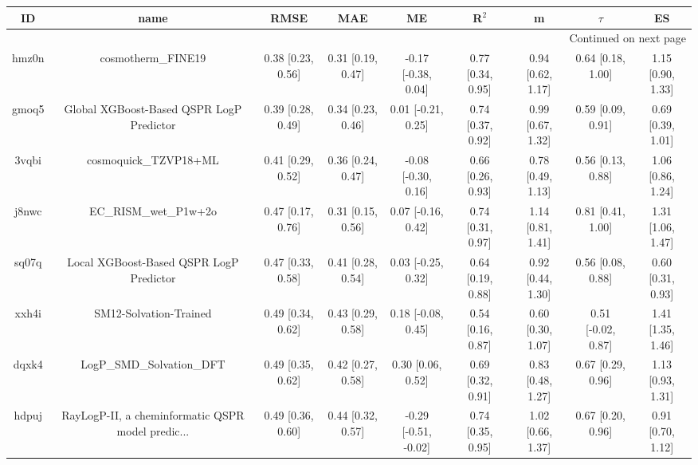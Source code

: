 \documentclass{article}
\begin{document}
\begin{center}
\scriptsize
\begin{longtable}{|ccccccccc|}
\toprule
    ID &                                               name &               RMSE &                MAE &                    ME &              R$^2$ &                    m &               $\tau$ &                    ES \\
\midrule
\endhead
\midrule
\multicolumn{9}{r}{{Continued on next page}} \\
\midrule
\endfoot

\bottomrule
\endlastfoot
 hmz0n &                                 cosmotherm\_FINE19 &  0.38 [0.23, 0.56] &  0.31 [0.19, 0.47] &   -0.17 [-0.38, 0.04] &  0.77 [0.34, 0.95] &    0.94 [0.62, 1.17] &    0.64 [0.18, 1.00] &     1.15 [0.90, 1.33] \\
 gmoq5 &           Global XGBoost-Based QSPR LogP Predictor &  0.39 [0.28, 0.49] &  0.34 [0.23, 0.46] &    0.01 [-0.21, 0.25] &  0.74 [0.37, 0.92] &    0.99 [0.67, 1.32] &    0.59 [0.09, 0.91] &     0.69 [0.39, 1.01] \\
 3vqbi &                              cosmoquick\_TZVP18+ML &  0.41 [0.29, 0.52] &  0.36 [0.24, 0.47] &   -0.08 [-0.30, 0.16] &  0.66 [0.26, 0.93] &    0.78 [0.49, 1.13] &    0.56 [0.13, 0.88] &     1.06 [0.86, 1.24] \\
 j8nwc &                              EC\_RISM\_wet\_P1w+2o &  0.47 [0.17, 0.76] &  0.31 [0.15, 0.56] &    0.07 [-0.16, 0.42] &  0.74 [0.31, 0.97] &    1.14 [0.81, 1.41] &    0.81 [0.41, 1.00] &     1.31 [1.06, 1.47] \\
 sq07q &            Local XGBoost-Based QSPR LogP Predictor &  0.47 [0.33, 0.58] &  0.41 [0.28, 0.54] &    0.03 [-0.25, 0.32] &  0.64 [0.19, 0.88] &    0.92 [0.44, 1.30] &    0.56 [0.08, 0.88] &     0.60 [0.31, 0.93] \\
 xxh4i &                             SM12-Solvation-Trained &  0.49 [0.34, 0.62] &  0.43 [0.29, 0.58] &    0.18 [-0.08, 0.45] &  0.54 [0.16, 0.87] &    0.60 [0.30, 1.07] &   0.51 [-0.02, 0.87] &     1.41 [1.35, 1.46] \\
 dqxk4 &                          LogP\_SMD\_Solvation\_DFT &  0.49 [0.35, 0.62] &  0.42 [0.27, 0.58] &     0.30 [0.06, 0.52] &  0.69 [0.32, 0.91] &    0.83 [0.48, 1.27] &    0.67 [0.29, 0.96] &     1.13 [0.93, 1.31] \\
 hdpuj &  RayLogP-II, a cheminformatic QSPR model predic... &  0.49 [0.36, 0.60] &  0.44 [0.32, 0.57] &  -0.29 [-0.51, -0.02] &  0.74 [0.35, 0.95] &    1.02 [0.66, 1.37] &    0.67 [0.20, 0.96] &     0.91 [0.70, 1.12] \\

\end{longtable}
\end{center}
\end{document}
